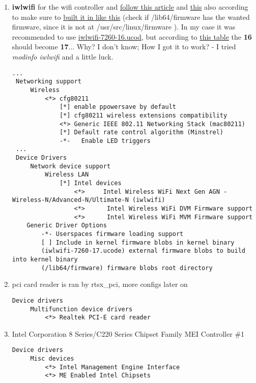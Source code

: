 \documentclass[11pt,a4paper]{article}
\begin{document}
\begin{enumerate}
                    \newpage
                    \item \textbf{iwlwifi} for the wifi controller and  \href{https://wiki.gentoo.org/wiki/Iwlwifi#Kernel}{follow this article} and \href{https://wiki.gentoo.org/wiki/Wifi#Kernel}{this} also according to make sure to \href{https://wiki.gentoo.org/wiki/Iwlwifi#When_using_built-in_configuration}{built it in like this} (check if /lib64/firmware has the wanted firmware, since it is not at /usr/src/linux/firmware ). In my case it was recommended to use \href{https://wiki.gentoo.org/wiki/Lenovo_ThinkPad_T440s#Required_packages}{iwlwifi-7260-16.ucod}, but according to \href{https://wireless.wiki.kernel.org/en/users/drivers/iwlwifi#firmware}{this table} the \textbf{16} should become \textbf{17}... Why? I don't know; How I got it to work? - I tried
                    \textit{modinfo iwlwifi} and a little luck.

                        \begin{lstlisting}[style=KernelConfig]
 ...
 Networking support
     Wireless
         <*> cfg80211
             [*] enable ppowersave by default
             [*] cfg80211 wireless extensions compatibility
             <*> Generic IEEE 802.11 Networking Stack (mac80211)
             [*] Default rate control algorithm (Minstrel)
             -*-   Enable LED triggers
 ...
 Device Drivers
     Network device support
         Wireless LAN
             [*] Intel devices
                 <*>     Intel Wireless WiFi Next Gen AGN - Wireless-N/Advanced-N/Ultimate-N (iwlwifi)
                 <*>      Intel Wireless WiFi DVM Firmware support
                 <*>      Intel Wireless WiFi MVM Firmware support
    Generic Driver Options
        -*- Userspaces firmware loading support
        [ ] Include in kernel firmware blobs in kernel binary
        (iwlwifi-7260-17.ucode) external firmware blobs to build into kernel binary
        (/lib64/firmware) firmware blobs root directory
                        \end{lstlisting}

                \newpage
                \item pci card reader is ran by rtsx\_pci, more configs later on

                    \begin{lstlisting}[style=KernelConfig]
 Device drivers
     Multifunction device drivers
         <*> Realtek PCI-E card reader
                    \end{lstlisting}
                    
                \newpage
                \item Intel Corporation 8 Series/C220 Series Chipset Family MEI Controller \#1
                
                    \begin{lstlisting}[style=KernelConfig]
 Device drivers
     Misc devices
         <*> Intel Management Engine Interface
         <*> ME Enabled Intel Chipsets
                    \end{lstlisting}

                \end{enumerate}
\end{document}
